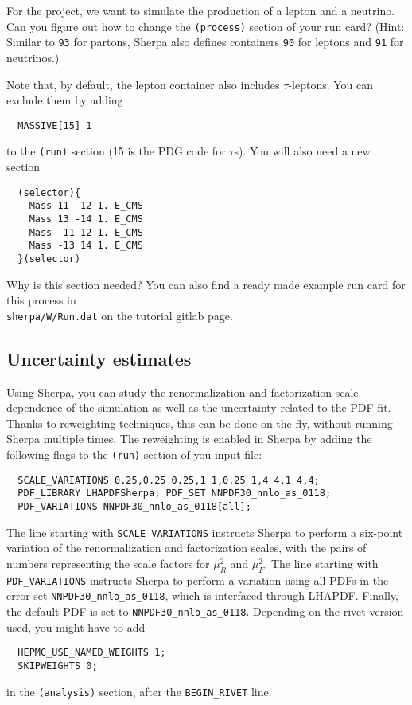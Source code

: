 \documentclass[10pt]{article}
\begin{document}
For the project, we want to simulate the production of a lepton and a
neutrino. Can you figure out how to change the {\tt (process)} section of your
run card? (Hint: Similar to {\tt 93} for partons, Sherpa also defines containers
{\tt 90} for leptons and {\tt 91} for neutrinos.)

Note that, by default, the lepton container also includes $\tau$-leptons. You
can exclude them by adding
%
\begin{verbatim}
  MASSIVE[15] 1
\end{verbatim}
%
to the {\tt (run)} section (15 is the PDG code for $\tau$s). You will also need
a new section
%
\begin{verbatim}
  (selector){
    Mass 11 -12 1. E_CMS
    Mass 13 -14 1. E_CMS
    Mass -11 12 1. E_CMS
    Mass -13 14 1. E_CMS
  }(selector)
\end{verbatim}
%
Why is this section needed? You can also find a ready made example run card for this process in\\
\texttt{sherpa/W/Run.dat} on the tutorial gitlab page.

\subsection{Uncertainty estimates}

Using Sherpa, you can study the renormalization and factorization
scale dependence of the simulation as well as the uncertainty
related to the PDF fit. Thanks to reweighting techniques, this can be done
on-the-fly, without running Sherpa multiple times. The reweighting is enabled in
Sherpa by adding the following flags to the {\tt (run)} section of you input file:
\begin{verbatim}
  SCALE_VARIATIONS 0.25,0.25 0.25,1 1,0.25 1,4 4,1 4,4;
  PDF_LIBRARY LHAPDFSherpa; PDF_SET NNPDF30_nnlo_as_0118;
  PDF_VARIATIONS NNPDF30_nnlo_as_0118[all];
\end{verbatim}
The line starting with {\tt SCALE\_VARIATIONS} instructs Sherpa to perform a
six-point variation of the renormalization and factorization scales,
with the pairs of numbers representing the scale factors for $\mu_R^2$
and $\mu_F^2$. The line starting with {\tt PDF\_VARIATIONS} instructs Sherpa
to perform a variation using all PDFs in the error set {\tt NNPDF30\_nnlo\_as\_0118}, which
is interfaced through LHAPDF. Finally, the default PDF is set to {\tt NNPDF30\_nnlo\_as\_0118}.
Depending on the rivet version used, you might have to add
\begin{verbatim}
  HEPMC_USE_NAMED_WEIGHTS 1;
  SKIPWEIGHTS 0;
\end{verbatim}
in the {\tt (analysis)} section, after the {\tt BEGIN\_RIVET} line.
\end{document}
